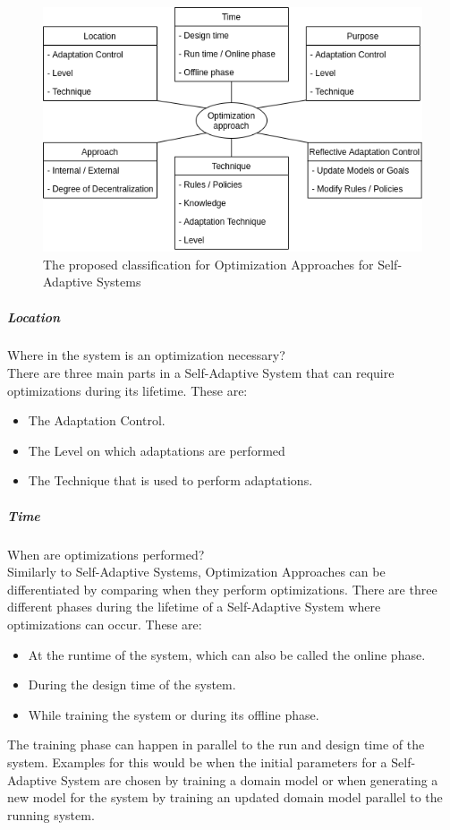 \newpage
\begin{figure}
    \centering
    \includegraphics[width=0.8\columnwidth]{images/ClassificationProposal-WithDimensions.png}
    \caption{The proposed classification for Optimization Approaches for Self-Adaptive Systems}
    \label{fig:Proposal}
\end{figure}

\subparagraph*{Location}
Where in the system is an optimization necessary? \\
There are three main parts in a Self-Adaptive System that can require optimizations during its lifetime.
These are:
\begin{itemize}
    \item The Adaptation Control.
    \item The Level on which adaptations are performed
    \item The Technique that is used to perform adaptations.
\end{itemize}

\subparagraph*{Time}
When are optimizations performed? \\
Similarly to Self-Adaptive Systems, Optimization Approaches can be differentiated by comparing when they perform optimizations.
There are three different phases during the lifetime of a Self-Adaptive System where optimizations can occur.
These are:
\begin{itemize}
    \item At the runtime of the system, which can also be called the online phase.
    \item During the design time of the system.
    \item While training the system or during its offline phase.
\end{itemize}
The training phase can happen in parallel to the run and design time of the system.
Examples for this would be when the initial parameters for a Self-Adaptive System are chosen by training a domain model
or when generating a new model for the system by training an updated domain model parallel to the running system.

